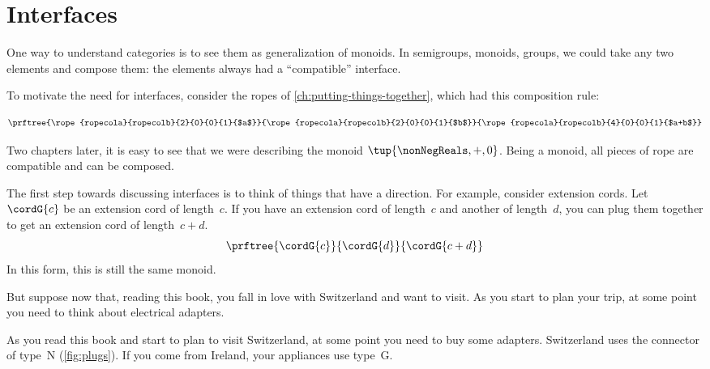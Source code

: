 
\section{Interfaces}

One way to understand categories is to see them as generalization of monoids. 
In semigroups, monoids, groups, we could take any two elements and compose them: the elements always had a ``compatible'' interface. 

To motivate the need for interfaces, consider the ropes of \cref{ch:putting-things-together},
which had this composition rule:

\begin{equation*}
\prftree{\rope{ropecola}{ropecolb}{2}{0}{0}{1}{$a$}}
{\rope{ropecola}{ropecolb}{2}{0}{0}{1}{$b$}}
{\rope{ropecola}{ropecolb}{4}{0}{0}{1}{$a+b$}}
\end{equation*}

Two chapters later, it is easy to see that we were describing the monoid $\tup{\nonNegReals, +, 0}$.
Being a monoid, all pieces of rope are compatible and can be composed.

The first step towards discussing interfaces is to think of things that have a direction. 
For example, consider extension cords. Let~$\cordG{c}$ be an extension cord of length~$c$.
If you have an extension cord of length~$c$ and another of length~$d$, you can plug them together to get an extension cord of length~$c+d$.
% 
\begin{equation}
  \label{eq:cords}
  \prftree{\cordG{c}}{\cordG{d}}{\cordG{c+d}}
\end{equation}
% 
In this form, this is still the same monoid. 

But suppose now that, reading this book, you fall in love with Switzerland and want to visit. 
As you start to plan your trip, at some point you need to think about electrical adapters.

As you read this book and start to plan to visit Switzerland, at some point you need to buy some adapters. 
Switzerland uses the connector of type~N (\cref{fig:plugs}).
If you come from Ireland, your appliances use type~G.

